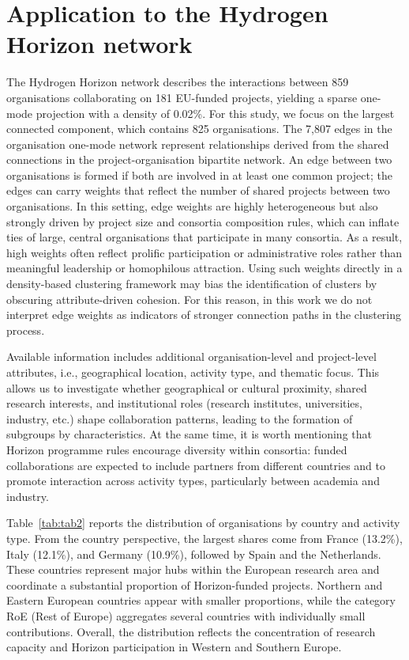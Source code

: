 \documentclass[11pt]{article}
\begin{document}
\clearpage

\section{Application to the Hydrogen Horizon network}\label{sec:application}

The Hydrogen Horizon network describes the interactions between 859 organisations collaborating on 181 EU-funded projects, yielding a sparse one-mode projection with a density of 0.02\%. For this study, we focus on the largest connected component, which contains 825 organisations. The 7,807 edges in the organisation one-mode network represent relationships derived from the shared connections in the project-organisation bipartite network.
An edge between two organisations is formed if both are involved in at least one common project; the edges can carry weights that reflect the number of shared projects between two organisations. In this setting, edge weights are highly heterogeneous but also strongly driven by project size and consortia composition rules, which can inflate ties of large, central organisations that participate in many consortia. As a result, high weights often reflect prolific participation or administrative roles rather than meaningful leadership or homophilous attraction. Using such weights directly in a density-based clustering framework may bias the identification of clusters by obscuring attribute-driven cohesion. For this reason, in this work we do not interpret edge weights as indicators of stronger connection paths in the clustering process.

Available information includes additional organisation-level and project-level attributes, i.e., geographical location, activity type, and thematic focus. This allows us to investigate whether geographical or cultural proximity, shared research interests, and institutional roles (research institutes, universities, industry, etc.) shape collaboration patterns, leading to the formation of subgroups by characteristics. At the same time, it is worth mentioning that Horizon programme rules encourage diversity within consortia: funded collaborations are expected to include partners from different countries and to promote interaction across activity types, particularly between academia and industry. 

Table~\ref{tab:tab2} reports the distribution of organisations by country and activity type. From the country perspective, the largest shares come from France (13.2\%), Italy (12.1\%), and Germany (10.9\%), followed by Spain and the Netherlands. These countries represent major hubs within the European research area and coordinate a substantial proportion of Horizon-funded projects. Northern and Eastern European countries appear with smaller proportions, while the category RoE (Rest of Europe) aggregates several countries with individually small contributions. Overall, the distribution reflects the concentration of research capacity and Horizon participation in Western and Southern Europe.
\end{document}
